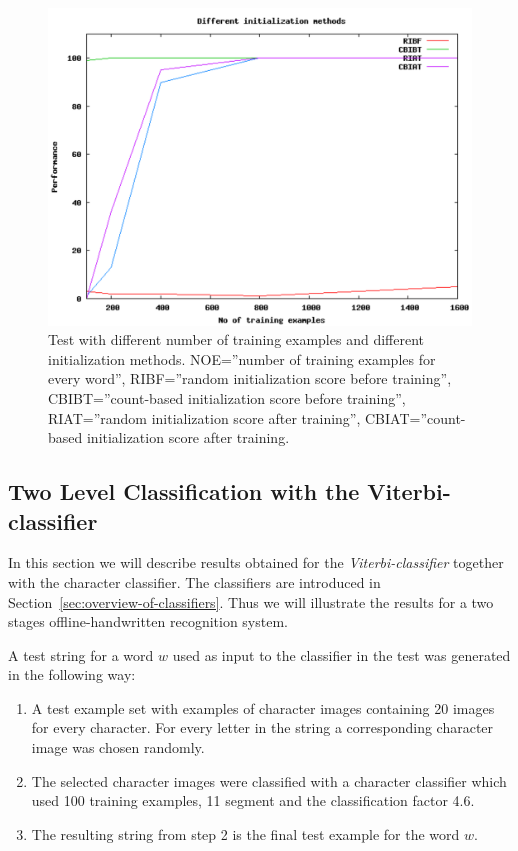 \begin{figure}[h!]
\centering
\includegraphics[scale=0.57]{initialization-methods}
\caption{Test with different number of training examples and different initialization methods.
	 NOE=''number of training examples for every word'',
         RIBF=''random initialization score before training'',
         CBIBT=''count-based initialization score before training'',
         RIAT=''random initialization score after training'',
         CBIAT=''count-based initialization score after training.}
\label{figure:initialization-methods}
\end{figure}

\subsection{Two Level Classification with the Viterbi-classifier}
In this section we will describe results obtained for the \emph{Viterbi-classifier} together with the character classifier.
The classifiers are introduced in Section~\ref{sec:overview-of-classifiers}.
Thus we will illustrate the results for a two stages offline-handwritten recognition system.

A test string for a word $w$ used as input to the classifier in the test was generated in the following way:

\begin{enumerate}
 \item A test example set with examples of character images containing 20 images for every character. 
For every letter in the string a corresponding character image was chosen randomly.
 \item The selected character images were classified with a character classifier which used 100 training examples, 11 segment and the classification factor 4.6.
 \item The resulting string from step 2 is the final test example for the word $w$.
\end{enumerate}

